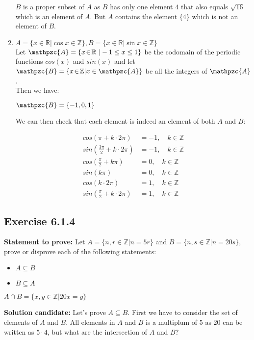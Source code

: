 \documentclass{report}
\newcommand{\cent}[1]{\begin{center}#1\end{center}}
\newcommand{\mAlign}[1]{\begin{align*}#1\end{align*}}
\newcommand{\doubleR}{\mathbb{R}}
\newcommand{\doubleZ}{\mathbb{Z}}
\newcommand{\In}{\! \in \!}
\newcommand{\script}[1]{\mathpzc{#1}}
\newcommand{\Prove}{\textbf{Statement to prove: }}
\newcommand{\Solution}{\textbf{Solution candidate: }}
\newcommand{\QED}{\boxed{}}
\newcommand{\Exercise}[1]{\subsection{Exercise #1}}
\begin{document}
\begin{enumerate}[label = \textbf{a.}]
		$B$ is a proper subset of $A$ as $B$ has only one element $4$ that also equals $\sqrt{16}$ which is an element of $A$. But $A$ contains the element $\{4\}$ which is not an element of $B$.
		
		\item $A = \{x \In \doubleR | \cos{x} \in \doubleZ\}, B = \{x \In \doubleR | \sin{x} \in \doubleZ\}$\\
		
		Let $\script{A} = \{x \In \doubleR\ | -1 \leq x \leq 1\}$ be the codomain of the periodic functions $cos(x)$ and $sin(x)$ and let $\script{B} = \{x \In \doubleZ | x \in \script{A}\}$ be all the integers of $\script{A}$.\\
		
		Then we have:
		
		\cent{$\script{B} = \{-1,0,1\}$}
		
		We can then check that each element is indeed an element of both $A$ and $B$:
		
		\mAlign{cos(\pi + k \cdot 2\pi) &= -1, \quad k \In \doubleZ\\
						sin(\frac{3\pi}{2} + k \cdot 2\pi) &= -1,  \quad k \In \doubleZ\\
						cos(\frac{\pi}{2} + k \pi) &= 0, \quad k \In \doubleZ\\
						sin(k\pi) &= 0, \quad k \In \doubleZ\\
						cos(k \cdot 2 \pi) &= 1,\quad k \In \doubleZ\\
						sin(\frac{\pi}{2} + k \cdot 2 \pi) &= 1,\quad k \In \doubleZ}
					
		\QED
	\end{enumerate}	
	
	\Exercise{6.1.4} 
		
	\Prove
	Let $A = \{n,r \In \doubleZ | n = 5r\}$ and $B = \{n,s \In \doubleZ | n = 20s\}$, prove or disprove each of the following statements:
	\begin{itemize}
		\item $A \subseteq B$
		\item $B \subseteq A$
	\end{itemize}

	\cent{$A \cap B = \{x,y \In \doubleZ | 20x = y\}$}
	
	\Solution
	Let's prove $A \subseteq B$. First we have to consider the set of elements of $A$ and $B$. All elements in $A$ and $B$ is a multiplum of 5 as $20$ can be written as $5 \cdot 4$, but what are the intersection of $A$ and $B$?\\
	
\end{document}
